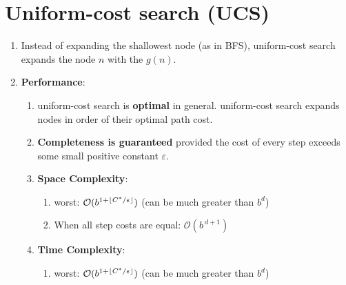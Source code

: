 \section{Uniform-cost search (UCS) \cite{ai/book/Artificial-Intelligence-A-Modern-Approach/Russell-Norvig}}


\begin{enumerate}[itemsep=0.2cm]
    \item Instead of expanding the shallowest node (as in BFS), uniform-cost search expands the node $n$ with the  $g(n)$.
    \hfill \cite{ai/book/Artificial-Intelligence-A-Modern-Approach/Russell-Norvig}

    \item \textbf{Performance}:
    \begin{enumerate}[itemsep=0.2cm]
        \item uniform-cost search is \textbf{optimal} in general. uniform-cost search expands nodes in order of their optimal path cost.
        \hfill \cite{ai/book/Artificial-Intelligence-A-Modern-Approach/Russell-Norvig}

        \item \textbf{Completeness is guaranteed} provided the cost of every step exceeds some small positive constant $\varepsilon$.
        \hfill \cite{ai/book/Artificial-Intelligence-A-Modern-Approach/Russell-Norvig}

        \item \textbf{Space Complexity}:
        \begin{enumerate}[itemsep=0.2cm]
            \item worst: $\mathcal{O}(b^{1 + \left \lfloor C^\ast / \varepsilon \right \rfloor})$
            \hfill (can be much greater than $b^d$)
            \hfill \cite{ai/book/Artificial-Intelligence-A-Modern-Approach/Russell-Norvig}

            \item When all step costs are equal: $\mathcal{O}(b^{\ d+1})$
            \hfill \cite{ai/book/Artificial-Intelligence-A-Modern-Approach/Russell-Norvig}
        \end{enumerate}

        \item \textbf{Time Complexity}:
        \begin{enumerate}[itemsep=0.2cm]
            \item worst: $\mathcal{O}(b^{1 + \left \lfloor C^\ast / \varepsilon \right \rfloor})$
            \hfill (can be much greater than $b^d$)
            \hfill \cite{ai/book/Artificial-Intelligence-A-Modern-Approach/Russell-Norvig}


\end{enumerate}
\end{enumerate}
\end{enumerate}
